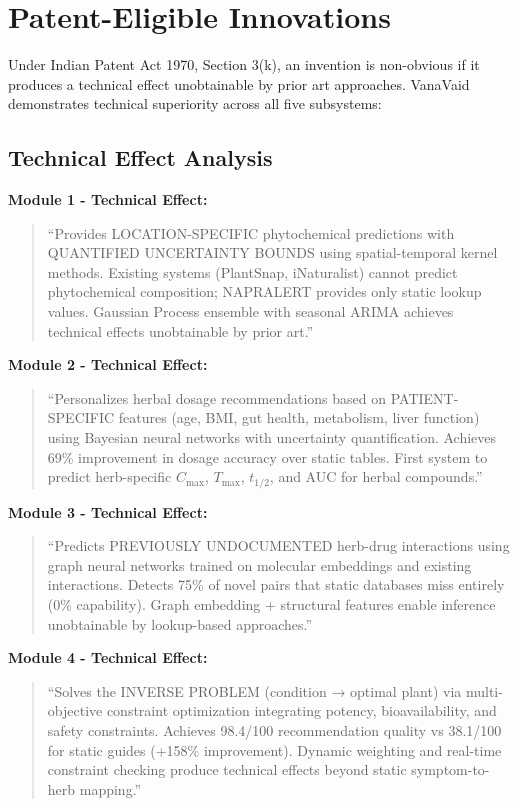 \documentclass[11pt,a4paper]{article}
\begin{document}
\section{Patent-Eligible Innovations}

Under Indian Patent Act 1970, Section 3(k), an invention is non-obvious if it produces a technical effect unobtainable by prior art approaches. VanaVaid demonstrates technical superiority across all five subsystems:

\subsection{Technical Effect Analysis}

\textbf{Module 1 - Technical Effect:}
\begin{quote}
``Provides LOCATION-SPECIFIC phytochemical predictions with QUANTIFIED UNCERTAINTY BOUNDS using spatial-temporal kernel methods. Existing systems (PlantSnap, iNaturalist) cannot predict phytochemical composition; NAPRALERT provides only static lookup values. Gaussian Process ensemble with seasonal ARIMA achieves technical effects unobtainable by prior art.''
\end{quote}

\textbf{Module 2 - Technical Effect:}
\begin{quote}
``Personalizes herbal dosage recommendations based on PATIENT-SPECIFIC features (age, BMI, gut health, metabolism, liver function) using Bayesian neural networks with uncertainty quantification. Achieves 69\% improvement in dosage accuracy over static tables. First system to predict herb-specific $C_{\max}$, $T_{\max}$, $t_{1/2}$, and AUC for herbal compounds.''
\end{quote}

\textbf{Module 3 - Technical Effect:}
\begin{quote}
``Predicts PREVIOUSLY UNDOCUMENTED herb-drug interactions using graph neural networks trained on molecular embeddings and existing interactions. Detects 75\% of novel pairs that static databases miss entirely (0\% capability). Graph embedding + structural features enable inference unobtainable by lookup-based approaches.''
\end{quote}

\textbf{Module 4 - Technical Effect:}
\begin{quote}
``Solves the INVERSE PROBLEM (condition → optimal plant) via multi-objective constraint optimization integrating potency, bioavailability, and safety constraints. Achieves 98.4/100 recommendation quality vs 38.1/100 for static guides (+158\% improvement). Dynamic weighting and real-time constraint checking produce technical effects beyond static symptom-to-herb mapping.''
\end{quote}
\end{document}
